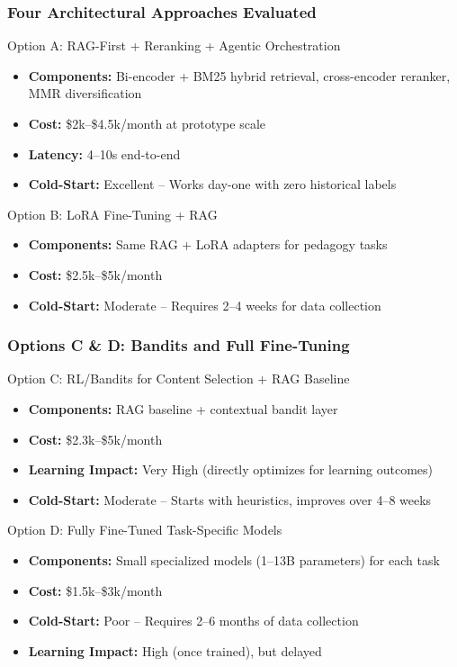 \documentclass[aspectratio=169]{beamer}
\begin{document}
\begin{frame}
\frametitle{Four Architectural Approaches Evaluated}
\begin{block}{Option A: RAG-First + Reranking + Agentic Orchestration}
\begin{itemize}
\item \textbf{Components:} Bi-encoder + BM25 hybrid retrieval, cross-encoder reranker, MMR diversification
\item \textbf{Cost:} \$2k--\$4.5k/month at prototype scale
\item \textbf{Latency:} 4--10s end-to-end
\item \textbf{Cold-Start:} \textcolor{mygreen}{Excellent} -- Works day-one with zero historical labels
\end{itemize}
\end{block}

\begin{block}{Option B: LoRA Fine-Tuning + RAG}
\begin{itemize}
\item \textbf{Components:} Same RAG + LoRA adapters for pedagogy tasks
\item \textbf{Cost:} \$2.5k--\$5k/month
\item \textbf{Cold-Start:} \textcolor{myorange}{Moderate} -- Requires 2--4 weeks for data collection
\end{itemize}
\end{block}
\end{frame}

\begin{frame}
\frametitle{Options C \& D: Bandits and Full Fine-Tuning}
\begin{block}{Option C: RL/Bandits for Content Selection + RAG Baseline}
\begin{itemize}
\item \textbf{Components:} RAG baseline + contextual bandit layer
\item \textbf{Cost:} \$2.3k--\$5k/month
\item \textbf{Learning Impact:} \textcolor{mygreen}{Very High} (directly optimizes for learning outcomes)
\item \textbf{Cold-Start:} \textcolor{myorange}{Moderate} -- Starts with heuristics, improves over 4--8 weeks
\end{itemize}
\end{block}

\begin{block}{Option D: Fully Fine-Tuned Task-Specific Models}
\begin{itemize}
\item \textbf{Components:} Small specialized models (1--13B parameters) for each task
\item \textbf{Cost:} \$1.5k--\$3k/month
\item \textbf{Cold-Start:} \textcolor{myred}{Poor} -- Requires 2--6 months of data collection
\item \textbf{Learning Impact:} High (once trained), but delayed
\end{itemize}
\end{block}
\end{frame}
\end{document}
